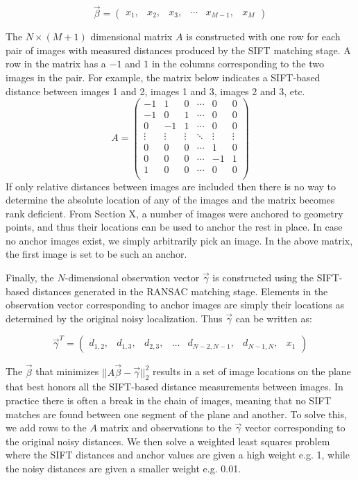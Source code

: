 \documentclass[]{spie}  %
\begin{document}
\[\vec{\beta} =
\begin{pmatrix}
  x_1, & x_2, & x_3, & \cdots & x_{M-1}, & x_M
\end{pmatrix}
\]

The $N \times (M+1)$ dimensional matrix $A$ is constructed with one
row for each pair of images with measured distances produced by the
SIFT matching stage. A row in the matrix has a $-1$ and $1$ in the
columns corresponding to the two images in the pair. For example, the
matrix below indicates a SIFT-based distance between images 1 and 2,
images 1 and 3, images 2 and 3, etc.
\[
A =
\begin{pmatrix}
  -1 & 1 & 0 & \cdots & 0 & 0\\
  -1 & 0 & 1 & \cdots & 0 & 0\\
  0 & -1 & 1 & \cdots & 0 & 0\\
  \vdots  & \vdots & \vdots & \ddots & \vdots  & \vdots\\
  0 & 0 & 0 & \cdots & 1 & 0 \\
  0 & 0 & 0 & \cdots & -1 & 1 \\
  1 & 0 & 0 & \cdots & 0 & 0 \\
\end{pmatrix}
\]
If only relative distances between images are included then there is
no way to determine the absolute location of any of the images and the
matrix becomes rank deficient. From Section X, a number of images were
anchored to geometry points, and thus their locations can be used to
anchor the rest in place. In case no anchor images exist, we simply
arbitrarily pick an image. In the above matrix, the first image is set
to be such an anchor.

Finally, the $N$-dimensional observation vector $\vec{\gamma}$ is
constructed using the SIFT-based distances generated in the RANSAC
matching stage. Elements in the observation vector corresponding to
anchor images are simply their locations as determined by the original
noisy localization. Thus $\vec{\gamma}$ can be written as:

\[
\vec{\gamma}^T =
\begin{pmatrix}
  d_{1,2}, &d_{1,3}, &d_{2,3}, &\hdots &d_{N-2,N-1}, &d_{N-1,N}, &x_1
\end{pmatrix}
\]

The $\vec{\beta}$ that minimizes $||A \vec{\beta} -
\vec{\gamma}||_2^2$ results in a set of image locations on the plane
that best honors all the SIFT-based distance measurements between
images. In practice there is often a break in the chain of images,
meaning that no SIFT matches are found between one segment of the
plane and another. To solve this, we add rows to the $A$ matrix and
observations to the $\vec{\gamma}$ vector corresponding to the
original noisy distances. We then solve a weighted least squares
problem where the SIFT distances and anchor values are given a high
weight e.g. 1, while the noisy distances are given a smaller weight
e.g. 0.01.
\end{document}
